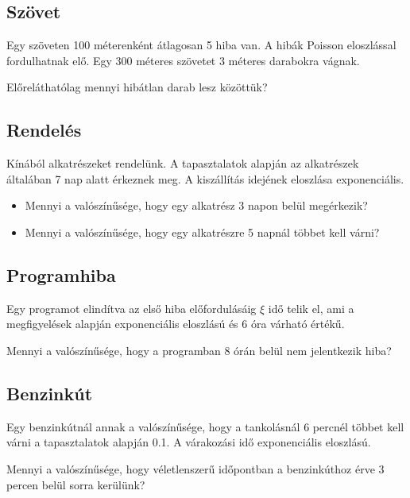 \documentclass[a4paper]{article}
\begin{document}

\subsection{Szövet}

Egy szöveten 100 méterenként átlagosan 5 hiba van.
A hibák Poisson eloszlással fordulhatnak elő.
Egy 300 méteres szövetet 3 méteres darabokra vágnak.

\medskip

Előreláthatólag mennyi hibátlan darab lesz közöttük?

\subsection{Rendelés}

Kínából alkatrészeket rendelünk.
A tapasztalatok alapján az alkatrészek általában 7 nap alatt érkeznek meg.
A kiszállítás idejének eloszlása exponenciális.

\medskip

\begin{itemize}
\item Mennyi a valószínűsége, hogy egy alkatrész 3 napon belül megérkezik?
\item Mennyi a valószínűsége, hogy egy alkatrészre 5 napnál többet kell várni?
\end{itemize}

\subsection{Programhiba}

Egy programot elindítva az első hiba előfordulásáig $\xi$ idő telik el, ami a megfigyelések alapján exponenciális eloszlású és 6 óra várható értékű.

\medskip

Mennyi a valószínűsége, hogy a programban 8 órán belül nem jelentkezik hiba?

\subsection{Benzinkút}

Egy benzinkútnál annak a valószínűsége, hogy a tankolásnál 6 percnél többet kell várni a tapasztalatok alapján 0.1.
A várakozási idő exponenciális eloszlású.

\medskip

Mennyi a valószínűsége, hogy véletlenszerű időpontban a benzinkúthoz érve 3 percen belül sorra kerülünk?
\end{document}

